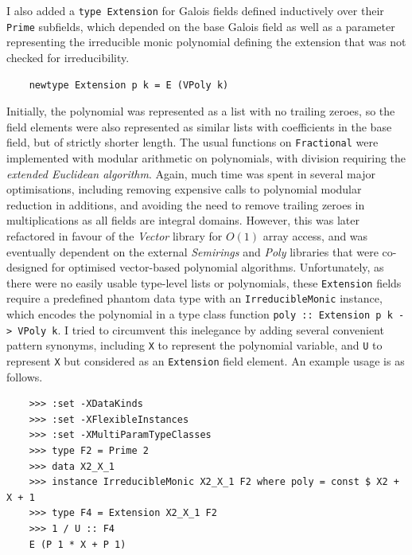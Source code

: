 \documentclass[11pt]{article}
\begin{document}
I also added a \texttt{type Extension} for Galois fields defined inductively over their \texttt{Prime} subfields, which depended on the base Galois field as well as a parameter representing the irreducible monic polynomial defining the extension that was not checked for irreducibility.
\begin{verbatim}
    newtype Extension p k = E (VPoly k)
\end{verbatim}
Initially, the polynomial was represented as a list with no trailing zeroes, so the field elements were also represented as similar lists with coefficients in the base field, but of strictly shorter length. The usual functions on \texttt{Fractional} were implemented with modular arithmetic on polynomials, with division requiring the \emph{extended Euclidean algorithm}. Again, much time was spent in several major optimisations, including removing expensive calls to polynomial modular reduction in additions, and avoiding the need to remove trailing zeroes in multiplications as all fields are integral domains. However, this was later refactored in favour of the \emph{Vector} library for $ O(1) $ array access, and was eventually dependent on the external \emph{Semirings} \cite{semirings} and \emph{Poly} \cite{poly} libraries that were co-designed for optimised vector-based polynomial algorithms. Unfortunately, as there were no easily usable type-level lists or polynomials, these \texttt{Extension} fields require a predefined phantom data type with an \texttt{IrreducibleMonic} instance, which encodes the polynomial in a type class function \texttt{poly :: Extension p k -> VPoly k}. I tried to circumvent this inelegance by adding several convenient pattern synonyms, including \texttt{X} to represent the polynomial variable, and \texttt{U} to represent \texttt{X} but considered as an \texttt{Extension} field element. An example usage is as follows.
\begin{verbatim}
    >>> :set -XDataKinds
    >>> :set -XFlexibleInstances
    >>> :set -XMultiParamTypeClasses
    >>> type F2 = Prime 2
    >>> data X2_X_1
    >>> instance IrreducibleMonic X2_X_1 F2 where poly = const $ X2 + X + 1
    >>> type F4 = Extension X2_X_1 F2
    >>> 1 / U :: F4
    E (P 1 * X + P 1)
\end{verbatim}
\end{document}
